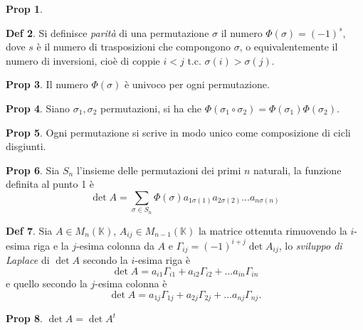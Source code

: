 \documentclass[]{article}
\theoremstyle{definition}
\theoremstyle{definition}
\newtheorem{prop}{Prop}[subsection]
\theoremstyle{definition}
\newtheorem{dfn}[prop]{Def}
\begin{document}
\begin{prop}
\end{prop} \begin{dfn} Si definisce \emph{parità} di una permutazione $\sigma$ il numero $\Phi (\sigma) = (-1)^s$, dove $s$ è il numero di trasposizioni che compongono $\sigma$, o equivalentemente il numero di inversioni, cioè di coppie $i<j$ t.c. $\sigma(i) > \sigma(j)$.

\end{dfn} \begin{prop} Il numero $\Phi(\sigma)$ è univoco per ogni permutazione.

\end{prop} \begin{prop} Siano $\sigma_1,\sigma_2$ permutazioni, si ha che $\Phi(\sigma_1 \circ \sigma_2)= \Phi(\sigma_1) \Phi(\sigma_2)$.

\end{prop} \begin{prop} Ogni permutazione si scrive in modo unico come composizione di cicli disgiunti.

\end{prop} \begin{prop} Sia $S_n$ l'insieme delle permutazioni dei primi $n$ naturali, la funzione definita al punto 1 è 
$$\det A = \sum _{\sigma \in S_n} \Phi(\sigma ) a_{1 \sigma (1)} a_{2 \sigma (2)} ... a_{n \sigma (n)}$$

\end{prop} \begin{dfn} Sia $A \in M_n ({\mathbb{K}})$, $A_{ij} \in M_{n-1} ({\mathbb{K}})$ la matrice ottenuta rimuovendo la $i$-esima riga e la $j$-esima colonna da $A$ e $\Gamma _{ij} = (-1)^{i+j} \det A_{ij}$, lo \emph{sviluppo di Laplace} di $\det A$ secondo la $i$-esima riga è 
$$\det A = a_{i1} \Gamma _{i1} + a_{i2} \Gamma _{i2} + ... a_{in} \Gamma _{in}$$
e quello secondo la $j$-esima colonna è
$$\det A = a_{1j} \Gamma _{1j} + a_{2j} \Gamma _{2j} + ... a_{nj} \Gamma _{nj}.$$

\end{dfn} \begin{prop} $\det A = \det A^t$


\end{prop}
\end{document}
